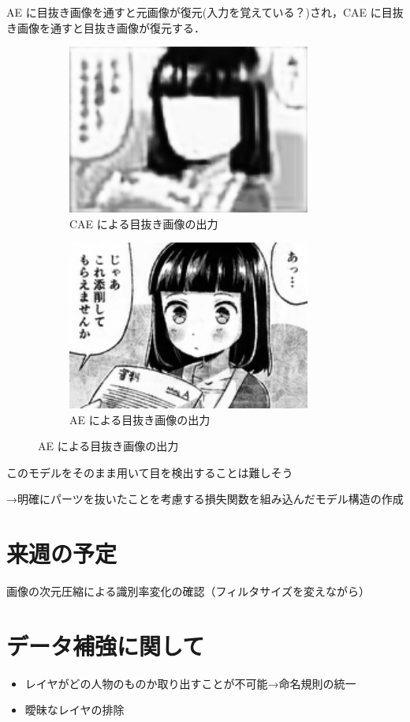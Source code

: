 \documentclass[onecolumn]{ujarticle}     %
\begin{document}
	AE に目抜き画像を通すと元画像が復元(入力を覚えている？)され，CAE に目抜き画像を通すと目抜き画像が復元する．
	
	\begin{figure}[t]
		\centering
		\begin{subfigure}{0.49\columnwidth}
			\centering
			\includegraphics[width=80mm]{CAE_weight_all_10.png}
			\caption{CAE による目抜き画像の出力}
		\end{subfigure}
		\begin{subfigure}{0.49\columnwidth}
			\centering
			\includegraphics[width=80mm]{AE_weight_all_10.png}
			\caption{AE による目抜き画像の出力}
			\label{fig:AE_decoded}
		\end{subfigure}
	\end{figure}

	このモデルをそのまま用いて目を検出することは難しそう
	
	→明確にパーツを抜いたことを考慮する損失関数を組み込んだモデル構造の作成
\newpage
\section{来週の予定}
	画像の次元圧縮による識別率変化の確認（フィルタサイズを変えながら）

\section{データ補強に関して}
	\begin{itemize}
		\item レイヤがどの人物のものか取り出すことが不可能→命名規則の統一
		\item 曖昧なレイヤの排除
	\end{itemize}
\end{document}
